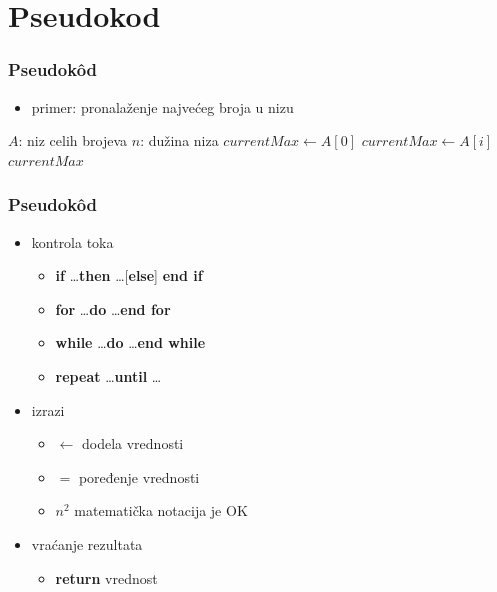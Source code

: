 \documentclass[compress]{beamer}
\begin{document}
\section[Pseudokôd]{Pseudokod}
\begin{frame}[fragile]
  \frametitle{Pseudokôd}
  \begin{itemize}
    \item primer: pronalaženje najvećeg broja u nizu
  \end{itemize}
\begin{algorithmic}
\REQUIRE $A$: niz celih brojeva
\REQUIRE $n$: dužina niza
\STATE $currentMax \leftarrow A[0]$
    \STATE $currentMax \leftarrow A[i]$
  \ENDIF
\ENDFOR
\RETURN $currentMax$
\end{algorithmic}
\end{frame}
\begin{frame}[fragile]
  \frametitle{Pseudokôd}
  \begin{itemize}
    \item kontrola toka
    \begin{itemize}
      \item \textbf{if} \ldots \textbf{then} \ldots [\textbf{else}] \textbf{end
      if} 
      \item \textbf{for} \ldots \textbf{do} \ldots \textbf{end for} 
      \item \textbf{while} \ldots \textbf{do} \ldots \textbf{end while} 
      \item \textbf{repeat} \ldots \textbf{until} \ldots 
    \end{itemize}
    \item izrazi 
    \begin{itemize}
      \item $\leftarrow$ dodela vrednosti 
      \item $=$ poređenje vrednosti 
      \item $n^2$ matematička notacija je OK 
    \end{itemize}
    \item vraćanje rezultata
    \begin{itemize}
      \item \textbf{return} vrednost 
    \end{itemize}
  \end{itemize}
\end{frame}
\end{document}
